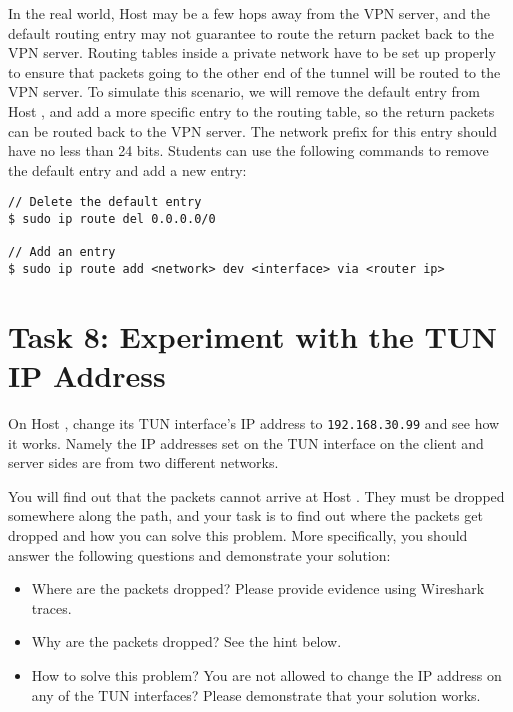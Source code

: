 In the real world, Host \hostv may be a few hops away from the VPN server, and the default routing entry 
may not guarantee to route the return packet back to the VPN server. Routing tables inside a 
private network have to be set up properly to ensure that packets going to the other end of the
tunnel will be routed to the VPN server. To simulate this scenario, we will 
remove the default entry from Host \hostv, and add a more specific entry to the routing 
table, so the return packets can be routed back to the VPN server. The network prefix 
for this entry should have no less than 24 bits.
Students can use the following commands to remove the default entry 
and add a new entry: 

\begin{lstlisting}
// Delete the default entry
$ sudo ip route del 0.0.0.0/0

// Add an entry
$ sudo ip route add <network> dev <interface> via <router ip>
\end{lstlisting}




\section{Task 8: Experiment with the TUN IP Address}

On Host \hostu, change its TUN interface's IP address to 
\texttt{192.168.30.99} and see how it works. 
Namely the IP addresses set on the TUN interface on the client
and server sides are from two different networks.  


You will find out that the packets cannot arrive at Host \hostv. They must be dropped somewhere
along the path, and your task is to 
find out where the packets get dropped and how you can solve this problem. More specifically,
you should answer the following questions and demonstrate your solution:


\begin{itemize}[noitemsep]
\item Where are the packets dropped? Please provide evidence using Wireshark traces.
\item Why are the packets dropped? See the hint below. 
\item How to solve this problem? You are not allowed to change the IP address on any of
the TUN interfaces? Please demonstrate that your solution works. 
\end{itemize}
 

